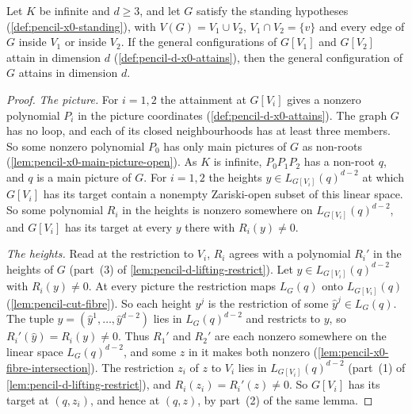 \begin{theorem}
  \label{thm:pencil-d-cut}
  \leanok
  Let $K$ be infinite and $d \ge 3$, and let $G$ satisfy the standing
  hypotheses (\cref{def:pencil-x0-standing}), with
  $V(G) = V_1 \cup V_2$, $V_1 \cap V_2 = \{v\}$ and every edge of $G$
  inside $V_1$ or inside $V_2$. If the general configurations of $G[V_1]$
  and $G[V_2]$ attain in dimension $d$
  (\cref{def:pencil-d-x0-attains}), then the general configuration of $G$
  attains in dimension $d$.
\end{theorem}
\begin{proof}
  \leanok
  \emph{The picture.} For $i = 1, 2$ the attainment at $G[V_i]$ gives a
  nonzero polynomial $P_i$ in the picture coordinates
  (\cref{def:pencil-d-x0-attains}). The graph $G$ has no loop, and each
  of its closed neighbourhoods has at least three members. So some
  nonzero polynomial $P_0$ has only main pictures of $G$ as non-roots
  (\cref{lem:pencil-x0-main-picture-open}). As $K$ is infinite,
  $P_0 P_1 P_2$ has a non-root $q$, and $q$ is a main picture of $G$. For
  $i = 1, 2$ the heights $y \in L_{G[V_i]}(q)^{d-2}$ at which $G[V_i]$ has
  its target contain a nonempty Zariski-open subset of this linear space.
  So some polynomial $R_i$ in the heights is nonzero somewhere on
  $L_{G[V_i]}(q)^{d-2}$, and $G[V_i]$ has its target at every $y$ there
  with $R_i(y) \neq 0$.

  \emph{The heights.} Read at the restriction to $V_i$, $R_i$ agrees with
  a polynomial $R_i'$ in the heights of $G$ (part~(3) of
  \cref{lem:pencil-d-lifting-restrict}). Let
  $y \in L_{G[V_i]}(q)^{d-2}$ with $R_i(y) \neq 0$. At every picture the
  restriction maps $L_G(q)$ onto $L_{G[V_i]}(q)$
  (\cref{lem:pencil-cut-fibre}). So each height $y^j$ is the restriction
  of some $\hat y^j \in L_G(q)$. The tuple
  $\hat y = (\hat y^1, \dots, \hat y^{d-2})$ lies in $L_G(q)^{d-2}$ and
  restricts to $y$, so $R_i'(\hat y) = R_i(y) \neq 0$. Thus $R_1'$ and
  $R_2'$ are each nonzero somewhere on the linear space $L_G(q)^{d-2}$,
  and some $z$ in it makes both nonzero
  (\cref{lem:pencil-x0-fibre-intersection}). The restriction $z_i$ of $z$
  to $V_i$ lies in $L_{G[V_i]}(q)^{d-2}$ (part~(1) of
  \cref{lem:pencil-d-lifting-restrict}), and $R_i(z_i) = R_i'(z) \neq 0$.
  So $G[V_i]$ has its target at $(q, z_i)$, and hence at $(q, z)$, by
  part~(2) of the same lemma.


\end{proof}
